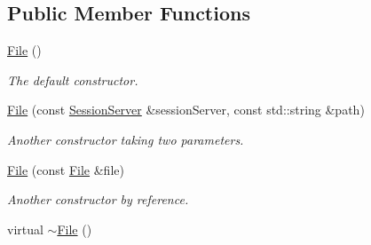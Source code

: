 \subsection*{Public Member Functions}
\begin{DoxyCompactItemize}
\item 
\hypertarget{classFile_ae039af5807fc385f41b60644725d15d0}{
\hyperlink{classFile_ae039af5807fc385f41b60644725d15d0}{File} ()}
\label{classFile_ae039af5807fc385f41b60644725d15d0}

\begin{DoxyCompactList}\small\item\em The default constructor. \item\end{DoxyCompactList}\item 
\hyperlink{classFile_a0b5d680c3ef10d1ffc746e67eda2e9ba}{File} (const \hyperlink{classSessionServer}{SessionServer} \&sessionServer, const std::string \&path)
\begin{DoxyCompactList}\small\item\em Another constructor taking two parameters. \item\end{DoxyCompactList}\item 
\hyperlink{classFile_a59bf1e7bb0c6b8dd83dccef6b942a0f9}{File} (const \hyperlink{classFile}{File} \&file)
\begin{DoxyCompactList}\small\item\em Another constructor by reference. \item\end{DoxyCompactList}\item 
\hypertarget{classFile_a313b1c0dbd15632f3e884639bb0bfa34}{
virtual \hyperlink{classFile_a313b1c0dbd15632f3e884639bb0bfa34}{$\sim$File} ()}
\label{classFile_a313b1c0dbd15632f3e884639bb0bfa34}


\end{DoxyCompactItemize}
